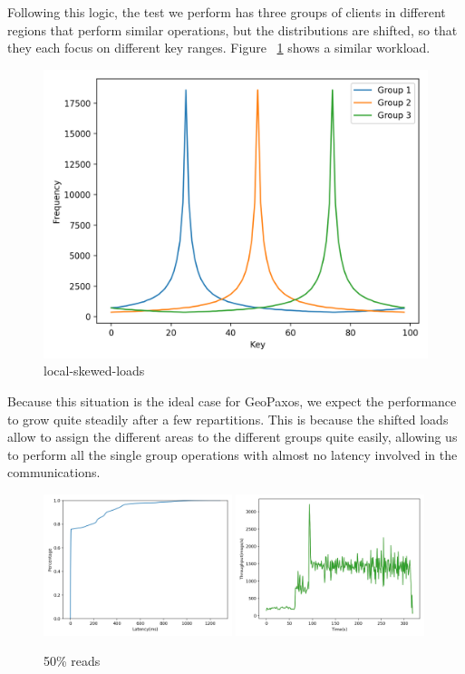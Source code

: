 Following this logic, the test we perform has three groups of clients in different regions that perform similar operations, but the distributions are shifted, so that they each focus on different key ranges. Figure ~\ref{fig:local-skewed-loads} shows a similar workload.

\begin{figure}[!htb]
  \centering
  \includegraphics[width=\textwidth,height=\textheight,keepaspectratio]{img/clients_loads.png}
  \caption{ local-skewed-loads }
  \label{fig:local-skewed-loads}
\end{figure}

Because this situation is the ideal case for GeoPaxos, we expect the performance to grow quite steadily after a few repartitions. This is because the shifted loads allow to assign the different areas to the different groups quite easily, allowing us to perform all the single group operations with almost no latency involved in the communications.

\begin{figure}[!htb]
  \centering
  \includegraphics[width=0.49\textwidth,height=\textheight,keepaspectratio]{img/local50_lat.png}
  \includegraphics[width=0.49\textwidth,height=\textheight,keepaspectratio]{img/local50_tp.png}
  \caption{ 50\% reads }
  \label{fig:local50-performance}
\end{figure}

